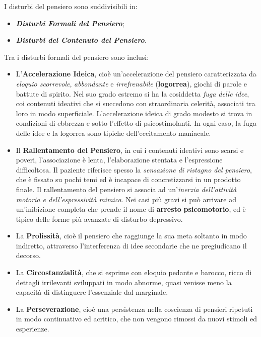 \documentclass[]{article}
\begin{document}
I disturbi del pensiero sono suddivisibili in:

\begin{itemize}
\item
  \textbf{\emph{Disturbi Formali del Pensiero}};
\item
  \textbf{\emph{Disturbi del Contenuto del Pensiero}}.
\end{itemize}

Tra i disturbi formali del pensiero sono inclusi:

\begin{itemize}
\item
  L'\textbf{Accelerazione Ideica}, cioè un'accelerazione del pensiero
  caratterizzata da \emph{eloquio scorrevole}, \emph{abbondante} e
  \emph{irrefrenabile} (\textbf{logorrea}), giochi di parole e battute
  di spirito. Nel suo grado estremo si ha la cosiddetta \emph{fuga delle
  idee}, coi contenuti ideativi che si succedono con straordinaria
  celerità, associati tra loro in modo superficiale. L'accelerazione
  ideica di grado modesto si trova in condizioni di ebbrezza e sotto
  l'effetto di psicostimolanti. In ogni caso, la fuga delle idee e la
  logorrea sono tipiche dell'eccitamento maniacale.
\item
  Il \textbf{Rallentamento del Pensiero}, in cui i contenuti ideativi
  sono scarsi e poveri, l'associazione è lenta, l'elaborazione stentata
  e l'espressione difficoltosa. Il paziente riferisce spesso la
  \emph{sensazione di ristagno del pensiero}, che è fissato su pochi
  temi ed è incapace di concretizzarsi in un prodotto finale. Il
  rallentamento del pensiero si associa ad un'\emph{inerzia
  dell'attività motoria e dell'espressività mimica}. Nei casi più gravi
  si può arrivare ad un'inibizione completa che prende il nome di
  \textbf{arresto} \textbf{psicomotorio}, ed è tipico delle forme più
  avanzate di disturbo depressivo.
\item
  La \textbf{Prolissità}, cioè il pensiero che raggiunge la sua meta
  soltanto in modo indiretto, attraverso l'interferenza di idee
  secondarie che ne pregiudicano il decorso.
\item
  La \textbf{Circostanzialità}, che si esprime con eloquio pedante e
  barocco, ricco di dettagli irrilevanti sviluppati in modo abnorme,
  quasi venisse meno la capacità di distinguere l'essenziale dal
  marginale.
\item
  La \textbf{Perseverazione}, cioè una persistenza nella coscienza di
  pensieri ripetuti in modo continuativo ed acritico, che non vengono
  rimossi da nuovi stimoli ed esperienze.

\end{itemize}
\end{document}
